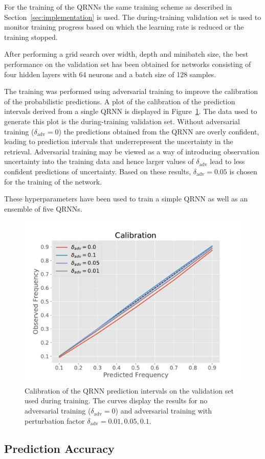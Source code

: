 \documentclass[journal abbreviation, manuscript]{copernicus}
\begin{document}
For the training of the QRNNs the same training scheme as described in
Section~\ref{sec:implementation} is used. The during-training validation
set is used to monitor training progress based on which the learning rate
is reduced or the training stopped.

After performing a grid search over width, depth and minibatch size, the best
performance on the validation set has been obtained for networks consisting of
four hidden layers with 64 neurons and a batch size of 128 samples.

The training was performed using adversarial training to improve the calibration
of the probabilistic predictions. A plot of the calibration of the prediction
intervals derived from a single QRNN is displayed in
Figure~\ref{fig:validation_calibration}. The data used to generate this plot is
the during-training validation set. Without adversarial training
($\delta_\text{adv} = 0$) the predictions obtained from the QRNN are overly
confident, leading to prediction intervals that underrepresent the uncertainty
in the retrieval. Adversarial training may be viewed as a way of introducing
observation uncertainty into the training data and hence larger values of
$\delta_\text{adv}$ lead to less confident predictions of uncertainty. Based on
these results, $\delta_\text{adv} = 0.05$ is chosen for the training of the
network.

These hyperparameters have been used to train a simple QRNN as well as
an ensemble of five QRNNs.

  \begin{figure}[hbpt!]
    \centering
    \includegraphics[width = 0.4\linewidth]{../plots/validation_calibration}
    \caption{Calibration of the QRNN prediction intervals on the validation set
      used during training. The curves display the results for no adversarial training
      ($\delta_\text{adv} = 0$) and adversarial training with perturbation
      factor $\delta_\text{adv} = 0.01, 0.05, 0.1$.}
    \label{fig:validation_calibration}
  \end{figure}


\subsection{Prediction Accuracy}
\end{document}
